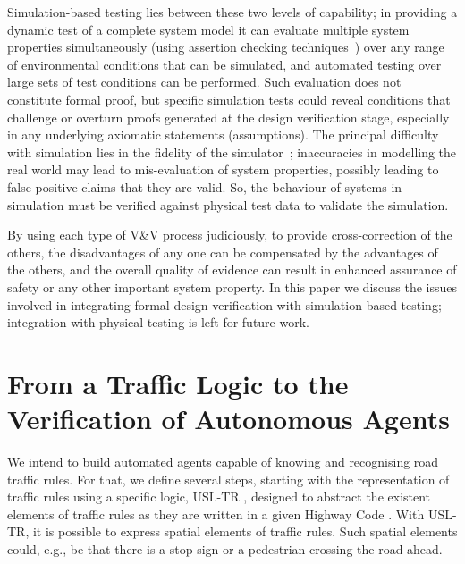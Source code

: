 \documentclass[runningheads,twocolumn,a4paper,10pt]{llncs}
\begin{document}
Simulation-based testing lies between these two levels of capability; in providing a dynamic test of a complete system model it can evaluate multiple system properties simultaneously (using assertion checking techniques~\cite{Harper21}) over any range of environmental conditions that can be simulated, and automated testing over large sets of test conditions can be performed. Such evaluation does not constitute formal proof, but specific simulation tests could reveal conditions that challenge or overturn proofs generated at the design verification stage, especially in any underlying axiomatic statements (assumptions). The principal difficulty with simulation lies in the fidelity of the simulator~\cite{determinism}; %
inaccuracies in modelling the real world may lead to mis-evaluation of system properties, possibly leading to false-positive claims that they are valid. So, the behaviour of systems in simulation must be verified against physical test data to validate the simulation.

By using each type of V\&V process judiciously, to provide cross-correction of the others, the disadvantages of any one can be compensated by the advantages of the others, and the overall quality of evidence can result in enhanced assurance of safety or any other important system property. In this paper we discuss the issues involved in integrating formal design verification with simulation-based testing; integration with physical testing is left for future work.

\section{From a Traffic Logic to the Verification of Autonomous Agents}\label{sec:traffic-agents}
We intend to build automated agents capable of knowing and recognising road traffic rules. For that, we define several steps, starting with the representation of traffic rules using a specific logic, USL-TR \cite{schwammbergerextending2021}, designed to abstract the existent elements of traffic rules as they are written in a given  Highway Code \cite{departmentfortransportusing2017}. With USL-TR, it is possible to express spatial elements of traffic rules. Such spatial elements could, e.g., be that there is a stop sign or a pedestrian crossing the road ahead.
\end{document}
